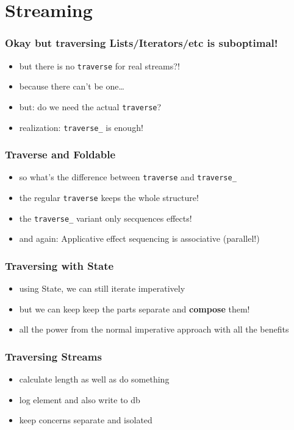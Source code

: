 \documentclass[aspectratio=169]{beamer}
\begin{document}
\section{Streaming}\label{sec:streaming}

\begin{frame}
  \frametitle{Okay but traversing Lists/Iterators/etc is suboptimal!}
  \begin{itemize}
  \item but there is no \texttt{traverse} for real streams?!
  \item because there can't be one\ldots
  \item but: do we need the actual \texttt{traverse}?
  \item realization: \texttt{traverse\_} is enough!
  \end{itemize}
\end{frame}

\begin{frame}
  \frametitle{Traverse and Foldable}
  \begin{itemize}
  \item so what's the difference between \texttt{traverse} and \texttt{traverse\_}
  \item the regular \texttt{traverse} keeps the whole structure!
  \item the \texttt{traverse\_} variant only secquences effects!
  \item and again: Applicative effect sequencing is associative (parallel!)
  \end{itemize}
\end{frame}

\begin{frame}
  \frametitle{Traversing with State}
  \begin{itemize}
  \item using State, we can still iterate imperatively
  \item but we can keep keep the parts separate and \textbf{compose} them!
  \item all the power from the normal imperative approach with all the benefits
  \end{itemize}
\end{frame}

\begin{frame}
  \frametitle{Traversing Streams}
  \begin{itemize}
  \item calculate length as well as do something
  \item log element and also write to db
  \item keep concerns separate and isolated
  \end{itemize}
\end{frame}
\end{document}
